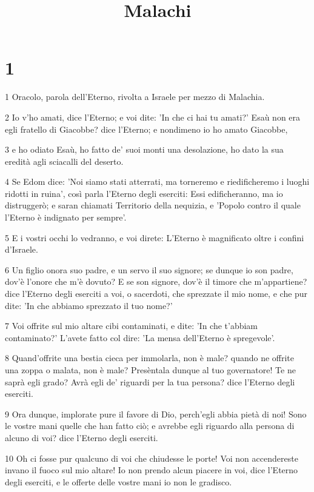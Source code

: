 

\title{Malachi}


\chapter{1}

\par 1 Oracolo, parola dell'Eterno, rivolta a Israele per mezzo di Malachia.
\par 2 Io v'ho amati, dice l'Eterno; e voi dite: 'In che ci hai tu amati?' Esaù non era egli fratello di Giacobbe? dice l'Eterno; e nondimeno io ho amato Giacobbe,
\par 3 e ho odiato Esaù, ho fatto de' suoi monti una desolazione, ho dato la sua eredità agli sciacalli del deserto.
\par 4 Se Edom dice: 'Noi siamo stati atterrati, ma torneremo e riedificheremo i luoghi ridotti in ruina', così parla l'Eterno degli eserciti: Essi edificheranno, ma io distruggerò; e saran chiamati Territorio della nequizia, e 'Popolo contro il quale l'Eterno è indignato per sempre'.
\par 5 E i vostri occhi lo vedranno, e voi direte: L'Eterno è magnificato oltre i confini d'Israele.
\par 6 Un figlio onora suo padre, e un servo il suo signore; se dunque io son padre, dov'è l'onore che m'è dovuto? E se son signore, dov'è il timore che m'appartiene? dice l'Eterno degli eserciti a voi, o sacerdoti, che sprezzate il mio nome, e che pur dite: 'In che abbiamo sprezzato il tuo nome?'
\par 7 Voi offrite sul mio altare cibi contaminati, e dite: 'In che t'abbiam contaminato?' L'avete fatto col dire: 'La mensa dell'Eterno è spregevole'.
\par 8 Quand'offrite una bestia cieca per immolarla, non è male? quando ne offrite una zoppa o malata, non è male? Presèntala dunque al tuo governatore! Te ne saprà egli grado? Avrà egli de' riguardi per la tua persona? dice l'Eterno degli eserciti.
\par 9 Ora dunque, implorate pure il favore di Dio, perch'egli abbia pietà di noi! Sono le vostre mani quelle che han fatto ciò; e avrebbe egli riguardo alla persona di alcuno di voi? dice l'Eterno degli eserciti.
\par 10 Oh ci fosse pur qualcuno di voi che chiudesse le porte! Voi non accendereste invano il fuoco sul mio altare! Io non prendo alcun piacere in voi, dice l'Eterno degli eserciti, e le offerte delle vostre mani io non le gradisco.
